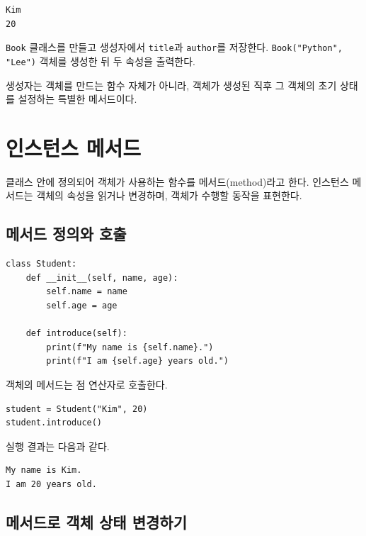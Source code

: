 \documentclass[11pt,a4paper]{article}
\begin{document}
\begin{verbatim}
Kim
20
\end{verbatim}

\begin{practicebox}
\texttt{Book} 클래스를 만들고 생성자에서 \texttt{title}과 \texttt{author}를 저장한다. \texttt{Book("Python", "Lee")} 객체를 생성한 뒤 두 속성을 출력한다.
\end{practicebox}

\begin{importantbox}
생성자는 객체를 만드는 함수 자체가 아니라, 객체가 생성된 직후 그 객체의 초기 상태를 설정하는 특별한 메서드이다.
\end{importantbox}

\section{인스턴스 메서드}

클래스 안에 정의되어 객체가 사용하는 함수를 메서드(method)라고 한다. 인스턴스 메서드는 객체의 속성을 읽거나 변경하며, 객체가 수행할 동작을 표현한다.

\subsection{메서드 정의와 호출}

\begin{lstlisting}
class Student:
    def __init__(self, name, age):
        self.name = name
        self.age = age

    def introduce(self):
        print(f"My name is {self.name}.")
        print(f"I am {self.age} years old.")
\end{lstlisting}

객체의 메서드는 점 연산자로 호출한다.

\begin{lstlisting}
student = Student("Kim", 20)
student.introduce()
\end{lstlisting}

실행 결과는 다음과 같다.

\begin{verbatim}
My name is Kim.
I am 20 years old.
\end{verbatim}

\subsection{메서드로 객체 상태 변경하기}
\end{document}
